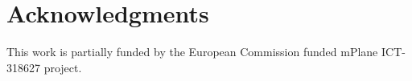 \section*{Acknowledgments}\label{ack}
This work is partially funded by the European Commission funded mPlane
ICT-318627 project.
